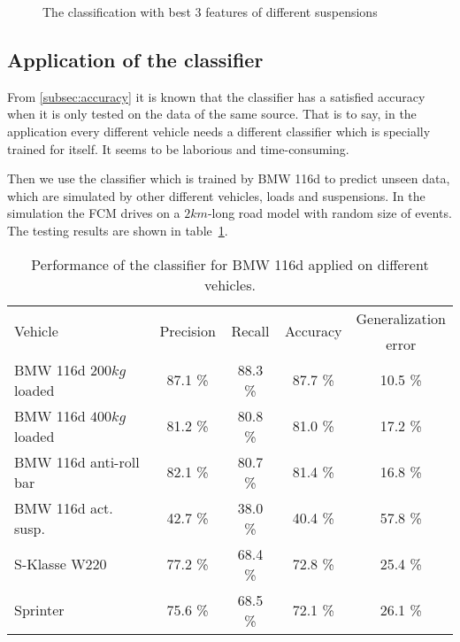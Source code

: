 \begin{figure}
 \label{fig:feature selection}
 \caption{The classification with best 3 features of different suspensions}
 \end{figure}


\subsection{Application of the classifier}

From \ref{subsec:accuracy} it is known that the classifier has a satisfied accuracy when it is only tested on the data of the same source.
%
That is to say, in the application every different vehicle needs a different classifier which is specially trained for itself.
%
It seems to be laborious and time-consuming.

Then we use the classifier which is trained by BMW 116d to predict unseen data, which are simulated by other different vehicles, loads and suspensions.
%
In the simulation the \ac{FCM} drives on a $2km$-long road model with random size of events.
%
The testing results are shown in table~\ref{tbl:vehicle variation}.

\begin{table}
\centering
\caption{Performance of the classifier for BMW 116d applied on different vehicles.}
\label{tbl:vehicle variation}
\begin{tabular}{lcccc}
\hline
\multirow{2}{*}{Vehicle} & \multirow{2}{*}{Precision} & \multirow{2}{*}{Recall} & \multirow{2}{*}{Accuracy} & Generalization \\
 & & & & error \\ \hline
BMW 116d $200kg$ loaded & 87.1 \% & 88.3 \% & 87.7 \% & 10.5 \% \\
BMW 116d $400kg$ loaded & 81.2 \% & 80.8 \% & 81.0 \% & 17.2 \% \\
BMW 116d anti-roll bar & 82.1 \% & 80.7 \% & 81.4 \% & 16.8 \% \\
BMW 116d act. susp. & 42.7 \% & 38.0 \% & 40.4 \% & 57.8 \% \\ 
S-Klasse W220 & 77.2 \% & 68.4 \% & 72.8 \% & 25.4 \% \\
Sprinter & 75.6 \% & 68.5 \% & 72.1 \% & 26.1 \% \\ \hline
\end{tabular}
\end{table}

